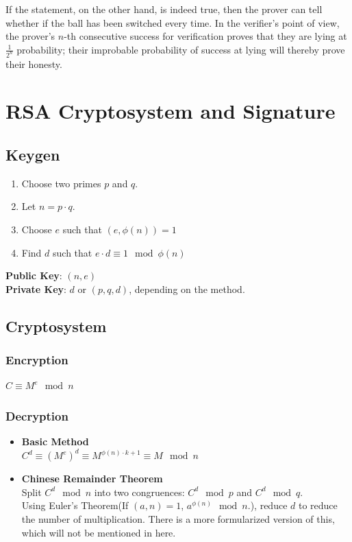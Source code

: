 \documentclass{report}
\begin{document}
		If the statement, on the other hand, is indeed true, then the prover can tell whether if the ball has been switched every time. In the verifier's point of view, the prover's $n$-th consecutive success for verification proves that they are lying at $\frac{1}{2^n}$ probability; their improbable probability of success at lying will thereby prove their honesty.
		
	\section{RSA Cryptosystem and Signature}
		\subsection{Keygen}
		\begin{enumerate}
			\item Choose two primes $p$ and $q$.
			\item Let $n=p\cdot q$.
			\item Choose $e$ such that $(e,\phi(n))=1$
			\item Find $d$ such that $e\cdot d\equiv 1 \mod \phi(n)$
		\end{enumerate}
		\textbf{Public Key}: $(n,e)$\\
		\textbf{Private Key}: $d$ or $(p,q,d)$, depending on the method.
		
		\subsection{Cryptosystem}
			\subsubsection{Encryption}
			$C\equiv M^e \mod n$
			
			\subsubsection{Decryption}
			\begin{itemize}
				\item \textbf{Basic Method}\\
				$C^d \equiv (M^e)^d \equiv M^{\phi(n)\cdot k+1}\equiv M \mod n$
				\item \textbf{Chinese Remainder Theorem}\\
				Split $C^d \mod n$ into two congruences: $C^d \mod p$ and $C^d \mod q$.\\
				Using Euler's Theorem(If $(a,n)=1$, $a^{\phi(n)} \mod n$.), reduce $d$ to reduce the number of multiplication. There is a more formularized version of this, which will not be mentioned in here.
			\end{itemize}
		
\end{document}
